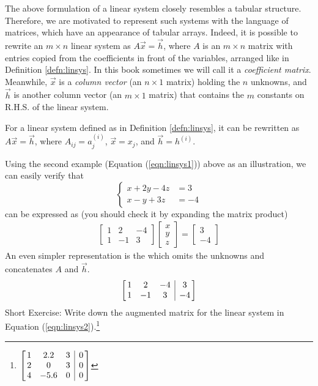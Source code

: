 The above formulation of a linear system closely resembles a tabular structure. Therefore, we are motivated to represent such systems with the language of matrices, which have an appearance of tabular arrays. Indeed, it is possible to rewrite an $m \times n$ linear system as $A\vec{x} = \vec{h}$, where $A$ is an $m \times n$ matrix with entries copied from the coefficients in front of the variables, arranged like in Definition \ref{defn:linsys}. In this book sometimes we will call it a \textit{coefficient matrix}. Meanwhile, $\vec{x}$ is a \textit{column vector} (an $n \times 1$ matrix) holding the $n$ unknowns, and $\vec{h}$ is another column vector (an $m \times 1$ matrix) that contains the $m$ constants on R.H.S. of the linear system.
\begin{proper}
\label{proper:linsysmat}
For a linear system defined as in Definition \ref{defn:linsys}, it can be rewritten as $A\vec{x} = \vec{h}$, where $A_{ij} = a_{j}^{(i)}$, $\vec{x} = x_j$, and $\vec{h} = h^{(i)}$.
\end{proper}
Using the second example (Equation (\ref{eqn:linsys1})) above as an illustration, we can easily verify that
\begin{equation*}
\begin{cases}
x + 2y - 4z &= 3 \\
x - y + 3z &= -4
\end{cases}   
\end{equation*}
can be expressed as (you should check it by expanding the matrix product)
\begin{align*}
\begin{bmatrix}
1 & 2 & -4 \\
1 & -1 & 3 
\end{bmatrix}
\begin{bmatrix}
x \\
y \\
z
\end{bmatrix}
=
\begin{bmatrix}
3 \\
-4
\end{bmatrix}
\end{align*}
An even simpler representation is the  which omits the unknowns and concatenates $A$ and $\vec{h}$.
\begin{equation*}
\left[\begin{array}{@{\,}ccc|c@{\,}}
1 & 2 & -4 & 3\\
1 & -1 & 3 & -4
\end{array}\right]
\end{equation*}
Short Exercise: Write down the augmented matrix for the linear system in Equation (\ref{eqn:linsys2}).\footnote{$
\left[\begin{array}{@{\,}ccc|c@{\,}}
1 & 2.2 & 3 & 0 \\
2 & 0 & 3 & 0 \\
4 & -5.6 & 0 & 0 \\
\end{array}\right]$}

